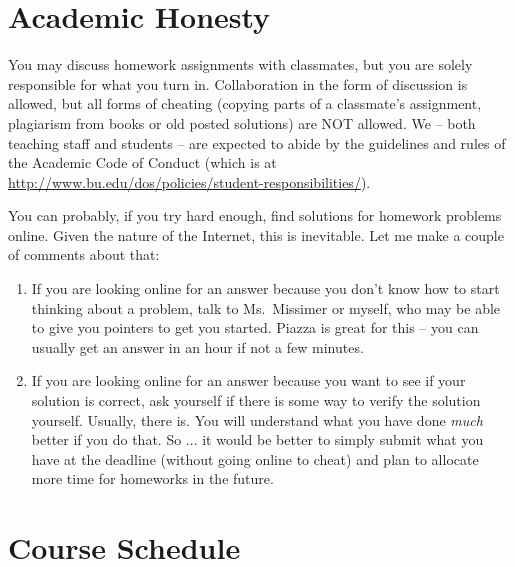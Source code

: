 \documentclass[11pt]{article}
\begin{document}
\newpage

\section*{Academic Honesty}

You may discuss homework assignments with classmates, but you are 
solely responsible for what you turn in. Collaboration in the form of
discussion is allowed, but all forms of cheating (copying parts of a
classmate's assignment, plagiarism from books or old posted solutions)
are NOT allowed. We -- both teaching staff and students -- are expected
to abide by the guidelines and rules of the Academic Code of Conduct
(which is at
\url{http://www.bu.edu/dos/policies/student-responsibilities/}).

You can probably, if you try hard enough, find solutions for homework
problems online.    Given the nature of the Internet, this is
inevitable.   Let me make a couple of comments about that:
\begin{enumerate}
\item If you are looking online for an answer because you don't know how
  to start thinking about a problem, talk to Ms.\ Missimer or myself, who may be
  able to give you pointers to get you started.  Piazza is great for
  this -- you can usually get an answer in an hour if not a few minutes.
\item If you are looking online for an answer because you want to see if
  your solution is correct, ask yourself if there is some way to verify
  the solution yourself.   Usually, there is.  You will understand what you have done
  \emph{much} better if you do that.
So ... it would be better to simply submit what you have at the deadline
(without going online to cheat) and plan to allocate more time for
homeworks in the future.
\end{enumerate}

\newpage
\section*{Course Schedule}
\end{document}
